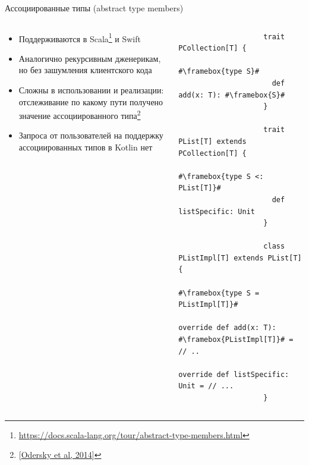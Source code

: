 \documentclass[usenames, dvipsnames]{beamer}
\begin{document}
    \begin{frame}[fragile]{Ассоциированные типы (abstract type members)}
        \vspace{-1.5em}
        \begin{columns}[onlytextwidth]
            \begin{column}[t]{0.40\textwidth}
                \begin{itemize}
                    \item Поддерживаются в Scala\footnote{\url{https://docs.scala-lang.org/tour/abstract-type-members.html}} и Swift
                    \item Аналогично рекурсивным дженерикам, но без зашумления клиентского кода
                    \item Сложны в использовании и реализации: отслеживание по какому пути получено значение ассоциированного типа\footnote{[\href{http://lampwww.epfl.ch/~amin/dot/fpdt_post.pdf}{Odersky et al, 2014}]}
                    \item Запроса от пользователей на поддержку ассоциированных типов в Kotlin нет
                \end{itemize}
            \end{column}\hfill%
            \begin{column}[t]{0.58\textwidth}
                \begin{verbatim}
                    trait PCollection[T] {
                      #\framebox{type S}#
                      def add(x: T): #\framebox{S}#
                    }

                    trait PList[T] extends PCollection[T] {
                      #\framebox{type S <: PList[T]}#
                      def listSpecific: Unit
                    }

                    class PListImpl[T] extends PList[T] {
                      #\framebox{type S = PListImpl[T]}#
                      override def add(x: T): #\framebox{PListImpl[T]}# = // ..
                      override def listSpecific: Unit = // ...
                    }
                \end{verbatim}
            \end{column}
        \end{columns}
    \end{frame}
\end{document}
